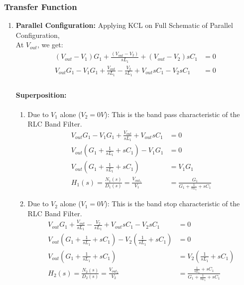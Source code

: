 \subsubsection{Transfer Function}
\begin{enumerate}
  \item \textbf{Parallel Configuration:}
    Applying KCL on Full Schematic of Parallel Configuration, \\
    At \(V_{out}\), we get:
    \begin{align*}
      (V_{out} - V_{1}){G_1} + \frac{(V_{out} - V_{2})}{sL_1} + (V_{out} - V_{2}){sC_1} &= 0 \\
      V_{out}G_1 - V_{1}G_1 + \frac{V_{out}}{sL_1} - \frac{V_{2}}{sL_1} + V_{out}sC_1 - V_{2}sC_1 &= 0 \\
    \end{align*}
    \paragraph{Superposition:}
      \begin{enumerate}
        \item Due to \(V_{1}\) alone (\(V_{2} = 0V\)):
          This is the band pass characteristic of the RLC Band Filter.
          \begin{align*}
            V_{out}G_1 - V_{1}G_1 + \frac{V_{out}}{sL_1} + V_{out}sC_1 &= 0 \\
            V_{out}(G_1 + \frac{1}{sL_1} + sC_1) - V_{1}G_1 &= 0 \\
            V_{out}(G_1 + \frac{1}{sL_1} + sC_1) &= V_{1}G_1 \\
            H_1(s) = \frac{N_1(s)}{D_1(s)} = \frac{V_{out_1}}{V_{1}} &= \frac{G_1}{G_1 + \frac{1}{sL_1} + sC_1}
          \end{align*}
        \item Due to \(V_{2}\) alone (\(V_{1} = 0V\)):
          This is the band stop characteristic of the RLC Band Filter.
          \begin{align*}
            V_{out}G_1 + \frac{V_{out}}{sL_1} - \frac{V_{2}}{sL_1} + V_{out}sC_1 - V_{2}sC_1 &= 0 \\
            V_{out}(G_1 + \frac{1}{sL_1} + sC_1) - V_{2}(\frac{1}{sL_1} + sC_1) &= 0 \\
            V_{out}(G_1 + \frac{1}{sL_1} + sC_1) &= V_{2}(\frac{1}{sL_1} + sC_1) \\
            H_2(s) = \frac{N_2(s)}{D_2(s)} = \frac{V_{out_2}}{V_{2}} &= \frac{\frac{1}{sL_1} + sC_1}{G_1 + \frac{1}{sL_1} + sC_1}
          \end{align*}
      \end{enumerate}

\end{enumerate}
